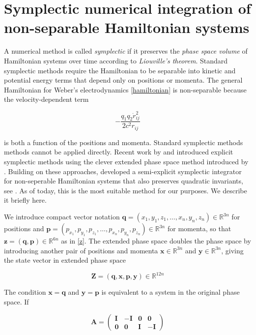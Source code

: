 \documentclass[12pt,a4paper]{article}
\theoremstyle{definition}
\theoremstyle{remark}
\newcommand{\qq}{q_1 q_2}
\begin{document}
\section{Symplectic numerical integration of non-separable Hamiltonian systems}
A numerical method is called \textit{symplectic} if it preserves the \textit{phase space volume} of Hamiltonian systems over time according to \textit{Liouville's theorem}. Standard symplectic methods require the Hamiltonian to be separable into kinetic and potential energy terms that depend only on positions or momenta. The general Hamiltonian for Weber's electrodynamics \eqref{hamiltonian} is non-separable because the velocity-dependent term

\begin{equation}
    -\frac{\qq \dot{r}_{ij}^2}{2 c^2 r_{ij}}
\end{equation}

is both a function of the positions and momenta. Standard symplectic methods methods cannot be applied directly. Recent work by \citep{Pihajoki2015} and \citep{Tao2016} introduced explicit symplectic methods using the clever extended phase space method introduced by \citep{Pihajoki2015}. Building on these approaches, \citep{Jayawardana2023} developed a semi-explicit symplectic integrator for non-seperable Hamiltonian systems that also preserves quadratic invariants, see \citep{Ohsawa2023}. As of today, this is the most suitable method for our purposes. We describe it briefly here.

We introduce compact vector notation $\mathbf{q} = (x_1, y_1, z_1, \ldots, x_n, y_n, z_n) \in \mathbb{R}^{3n}$ for positions and $\mathbf{p} = (p_{x_1}, p_{y_1}, p_{z_1}, \ldots, p_{x_n}, p_{y_n}, p_{z_n}) \in \mathbb{R}^{3n}$ for momenta, so that $\mathbf{z} = (\mathbf{q}, \mathbf{p}) \in \mathbb{R}^{6n}$ as in \eqref{z}. The extended phase space doubles the phase space by introducing another pair of positions and momenta $\mathbf{x} \in \mathbb{R}^{3n}$ and $\mathbf{y} \in \mathbb{R}^{3n}$, giving the state vector in extended phase space

\begin{equation}\label{Z}
    \mathbf{Z} = (\mathbf{q}, \mathbf{x}, \mathbf{p}, \mathbf{y}) \in \mathbb{R}^{12n}
\end{equation}

The condition $\mathbf{x} = \mathbf{q}$ and $\mathbf{y} = \mathbf{p}$ is equivalent to a system in the original phase space. If

\begin{equation}
    \mathbf{A} = \begin{pmatrix}
        \mathbf{I} & -\mathbf{I} & \mathbf{0} & \mathbf{0}  \\
        \mathbf{0} & \mathbf{0}  & \mathbf{I} & -\mathbf{I}
    \end{pmatrix}
\end{equation}
\end{document}
